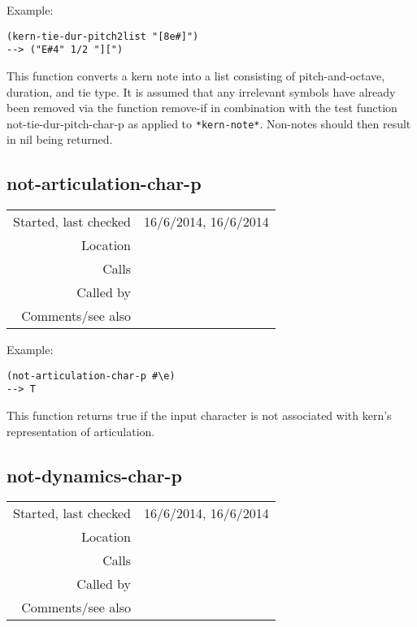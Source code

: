 \vspace{0.5cm}
\noindent Example:
\begin{verbatim}
(kern-tie-dur-pitch2list "[8e#]")
--> ("E#4" 1/2 "][")
\end{verbatim}

\noindent This function converts a kern note into a
list consisting of pitch-and-octave, duration, and tie
type. It is assumed that any irrelevant symbols have
already been removed via the function remove-if in
combination with the test function
not-tie-dur-pitch-char-p as applied to
\texttt{*kern-note*}. Non-notes should then result in
nil being returned.


\subsection*{not-articulation-char-p}\label{fun:not-articulation-char-p}

\vspace{0.3cm}
\begin{tabular}{r|p{8cm}}
Started, last checked & 16/6/2014, 16/6/2014 \\
Location & \nameref{sec:kern} \\
Calls & \\
Called by & \nameref{fun:kern-file2points-artic-dynam-lyrics} \\
Comments/see also &
\end{tabular}

\vspace{0.5cm}
\noindent Example:
\begin{verbatim}
(not-articulation-char-p #\e)
--> T
\end{verbatim}

\noindent This function returns true if the input
character is not associated with kern's representation
of articulation.


\subsection*{not-dynamics-char-p}\label{fun:not-dynamics-char-p}

\vspace{0.3cm}
\begin{tabular}{r|p{8cm}}
Started, last checked & 16/6/2014, 16/6/2014 \\
Location & \nameref{sec:kern} \\
Calls & \\
Called by & \nameref{fun:kern-file2points-artic-dynam-lyrics} \\
Comments/see also &
\end{tabular}

